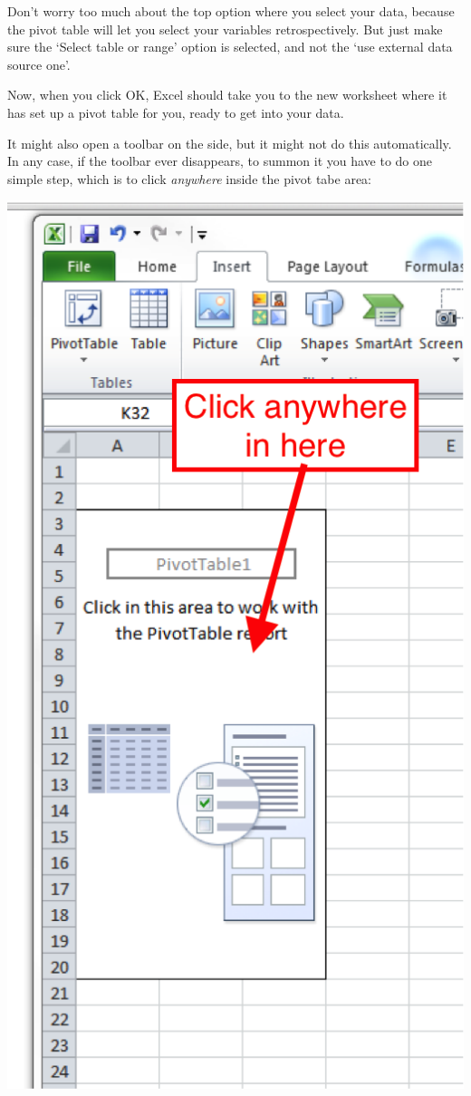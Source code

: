 \documentclass[
]{book}
\begin{document}
Don't worry too much about the top option where you select your data, because the pivot table will let you select your variables retrospectively. But just make sure the `Select table or range' option is selected, and not the `use external data source one'.

Now, when you click OK, Excel should take you to the new worksheet where it has set up a pivot table for you, ready to get into your data.

It might also open a toolbar on the side, but it might not do this automatically. In any case, if the toolbar ever disappears, to summon it you have to do one simple step, which is to click \emph{anywhere} inside the pivot tabe area:

\includegraphics{imgs/pivot_shell.png}
\end{document}

